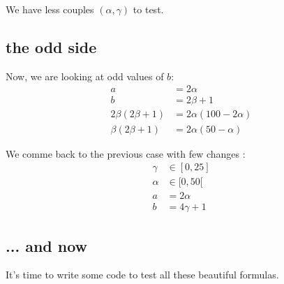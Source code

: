 We have less couples $(\alpha, \gamma)$ to test.

\subsection{the odd side}
Now, we are looking at odd values of $b$:
\begin{equation}\label{eq:pow2odd}
\begin{split}
	a &= 2 \alpha \\
	b &= 2 \beta + 1\\
	2 \beta(2 \beta + 1) &= 2 \alpha(100 - 2 \alpha) \\
	\beta(2\beta + 1) &= 2 \alpha(50 - \alpha)
\end{split}
\end{equation}

We comme back to the previous case with few changes :
\begin{equation}\label{eq:pow2:5}
\begin{split}
	\gamma &\in [0, 25] \\
	\alpha &\in [0, 50[ \\
	a &= 2 \alpha \\
	b &= 4 \gamma + 1
\end{split}
\end{equation}

\subsection{... and now}
It's time to write some code to test all these beautiful formulas.
